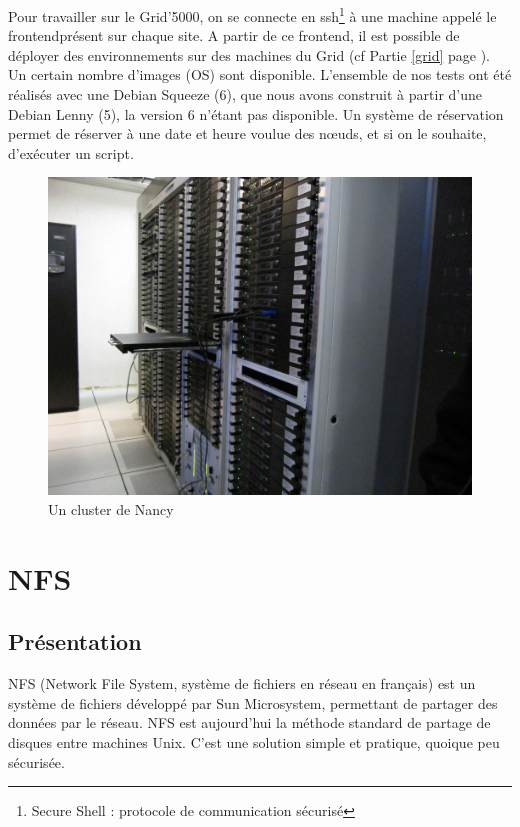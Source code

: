 \documentclass[12pt]{report}
\begin{document}
		Pour travailler sur le Grid'5000, on se connecte en ssh\footnote{Secure Shell : protocole de communication sécurisé} à une machine appelé le \og frontend\fg  présent sur chaque site.
		A partir de ce frontend, il est possible de déployer des environnements sur des machines du Grid (cf Partie \ref{grid} page \pageref{grid}).
		Un certain nombre d'images (OS) sont disponible. L'ensemble de nos tests ont été réalisés avec une Debian Squeeze (6),
		que nous avons construit à partir d'une Debian Lenny (5), la version 6 n'étant pas disponible.
		Un système de réservation permet de réserver à une date et heure voulue des nœuds, et si on le souhaite,
		d'exécuter un script.

		\begin{figure}[H]
			\begin{center}
				\includegraphics[width=0.6\linewidth]{images/cluster_nancy.jpg}
				\caption{Un cluster de Nancy}
			\end{center}
		\end{figure}
		


	\chapter{NFS}
		\section{Présentation}

NFS (Network File System, système de fichiers en réseau en français) est un système de fichiers développé par Sun Microsystem, permettant de partager des données par le réseau. NFS est aujourd’hui la méthode standard de partage de disques entre machines Unix. 
		C’est une solution simple et pratique, quoique peu sécurisée.\\
		
\end{document}
